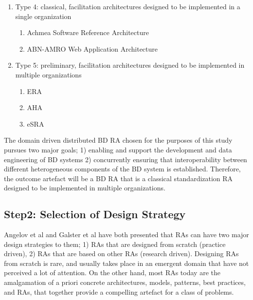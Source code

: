 \documentclass[review]{elsarticle}
\begin{document}
\begin{enumerate}
\begin{enumerate}
        \item Type 4: classical, facilitation architectures designed to be implemented in a single organization
        \begin{enumerate}
            \item Achmea Software Reference Architecture   \cite{greefhorst2006achmea}
            \item ABN-AMRO Web Application Architecture \cite{greefhorst1999een}
        \end{enumerate}

        \item Type 5: preliminary, facilitation architectures designed to be implemented in multiple organizations
        \begin{enumerate}
            \item ERA   \cite{angelov2008contracting}
            \item AHA   \cite{wu2002reference}
            \item eSRA  \cite{norta2007exploring}
        \end{enumerate}
    \end{enumerate}
  \end{enumerate}

The domain driven distributed BD RA chosen for the purposes of this study pursues two major goals; 1) enabling and support the development and data engineering of BD systems 2) concurrently ensuring that interoperability between different heterogeneous components of the BD system is established. Therefore, the outcome artefact will be a BD RA that is a classical standardization RA designed to be implemented in multiple organizations.

\subsection{Step2: Selection of Design Strategy}

Angelov et al \cite{angelov2008towards} and Galster et al\cite{galster2011empirically} have both presented that RAs can have two major design strategies to them; 1) RAs that are designed from scratch (practice driven), 2) RAs that are based on other RAs (research driven). Designing RAs from scratch is rare, and usually takes place in an emergent domain that have not perceived a lot of attention. On the other hand, most RAs today are the amalgamation of a priori concrete architectures, models, patterns, best practices, and RAs, that together provide a compelling artefact for a class of problems.
\end{document}
